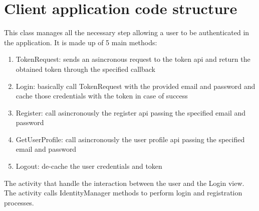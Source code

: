 \section{Client application code structure}

This class manages all the necessary step allowing a user to be authenticated in the application. It is made up of 5 main methods:

\begin{enumerate}
\item TokenRequest: sends an asincronous request to the token api and return the obtained token through the specified callback
\item Login: basically call TokenRequest with the provided email and password and cache those credentials with the token in case of success
\item Register: call asincronously the register api passing the specified email and password
\item GetUserProfile: call asincronously the user profile api passing the specified email and password
\item Logout: de-cache the user credentials and token
\end{enumerate}


The activity that handle the interaction between the user and the Login view. The activity calls IdentityManager methods to perform login and registration processes.

